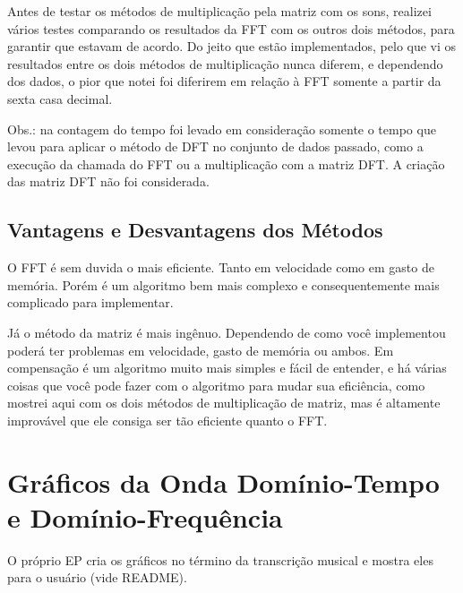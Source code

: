 \documentclass[a4paper,11pt]{article}
\begin{document}
Antes de testar os métodos de multiplicação pela matriz com os sons, realizei vários testes comparando os resultados da FFT com
os outros dois métodos, para garantir que estavam de acordo. Do jeito que estão implementados, pelo que vi os resultados entre os
dois métodos de multiplicação nunca diferem, e dependendo dos dados, o pior que notei foi diferirem em relação à FFT somente a
partir da sexta casa decimal.

Obs.: na contagem do tempo foi levado em consideração somente o tempo que levou para aplicar o método de DFT no conjunto de dados
passado, como a execução da chamada do FFT ou a multiplicação com a matriz DFT. A criação das matriz DFT não foi considerada.

\subsection{Vantagens e Desvantagens dos Métodos}

O FFT é sem duvida o mais eficiente. Tanto em velocidade como em gasto de memória. Porém é um algoritmo bem mais complexo e
consequentemente mais complicado para implementar.

Já o método da matriz é mais ingênuo. Dependendo de como você implementou poderá ter problemas em velocidade, gasto de memória
ou ambos. Em compensação é um algoritmo muito mais simples e fácil de entender, e há várias coisas que você pode fazer com o
algoritmo para mudar sua eficiência, como mostrei aqui com os dois métodos de multiplicação de matriz, mas é altamente improvável
que ele consiga ser tão eficiente quanto o FFT.

\section{Gráficos da Onda Domínio-Tempo e Domínio-Frequência}

O próprio EP cria os gráficos no término da transcrição musical e mostra eles para o usuário (vide README).
\end{document}
